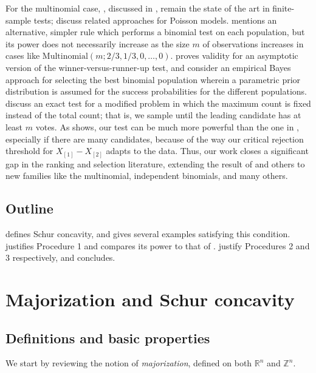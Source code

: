 \documentclass[aos, authoryear]{imsart}
\theoremstyle{definition}
\theoremstyle{custom}
\newcommand{\RR}{\mathbb{R}}
\newcommand{\ZZ}{\mathbb{Z}}
\begin{document}
For the multinomial case, \citet{Gupta:1967wg}, discussed in , remain the state of the art in finite-sample tests; \citet{Gupta:1976vd} discuss related approaches for Poisson models. \citet{Berger:1980ev} mentions an alternative, simpler rule which performs a binomial test on each population, but its power does not necessarily increase as the size $m$ of observations increases in cases like $\text{Multinomial}(m; 2/3, 1/3, 0, \ldots, 0)$. \citet{Nettleton:2009ht} proves validity for an asymptotic version of the winner-versus-runner-up test, and \citet{Gupta:1989fe} consider an empirical Bayes approach for selecting the best binomial population wherein a parametric prior distribution is assumed for the success probabilities for the different populations. \citet{Ng:2007cn} discuss an exact test for a modified problem in which the maximum count is fixed instead of the total count; that is, we sample until the leading candidate has at least $m$ votes. As  shows, our test can be much more powerful than the one in \citet{Gupta:1967wg}, especially if there are many candidates, because of the way our critical rejection threshold for $X_{[1]} - X_{[2]}$ adapts to the data. Thus, our work closes a significant gap in the ranking and selection literature, extending the result of \citet{Gutmann:1987fk} and others to new families like the multinomial, independent binomials, and many others.

\subsection{Outline}

 defines Schur concavity, and gives several examples satisfying this condition.  justifies Procedure 1 and compares its power to that of \citet{Gupta:1967wg}.  justify Procedures 2 and 3 respectively, and  concludes.

\section{Majorization and Schur concavity}
\label{sec:maj}

\subsection{Definitions and basic properties}

We start by reviewing the notion of {\em majorization}, defined on both $\RR^n$ and $\ZZ^n$.
\end{document}
